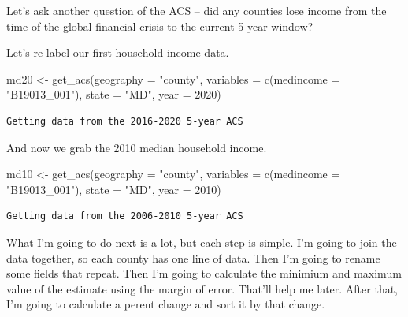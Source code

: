 \documentclass[
  letterpaper,
  DIV=11,
  numbers=noendperiod]{scrreprt}
\newenvironment{Shaded}{\begin{snugshade}}{\end{snugshade}}
\newcommand{\AttributeTok}[1]{\textcolor[rgb]{0.40,0.45,0.13}{#1}}
\newcommand{\DecValTok}[1]{\textcolor[rgb]{0.68,0.00,0.00}{#1}}
\newcommand{\FunctionTok}[1]{\textcolor[rgb]{0.28,0.35,0.67}{#1}}
\newcommand{\NormalTok}[1]{\textcolor[rgb]{0.00,0.23,0.31}{#1}}
\newcommand{\OtherTok}[1]{\textcolor[rgb]{0.00,0.23,0.31}{#1}}
\newcommand{\StringTok}[1]{\textcolor[rgb]{0.13,0.47,0.30}{#1}}
\begin{document}
Let's ask another question of the ACS -- did any counties lose income
from the time of the global financial crisis to the current 5-year
window?

Let's re-label our first household income data.

\begin{Shaded}
\begin{Highlighting}[]
\NormalTok{md20 }\OtherTok{\textless{}{-}} \FunctionTok{get\_acs}\NormalTok{(}\AttributeTok{geography =} \StringTok{"county"}\NormalTok{,}
              \AttributeTok{variables =} \FunctionTok{c}\NormalTok{(}\AttributeTok{medincome =} \StringTok{"B19013\_001"}\NormalTok{),}
              \AttributeTok{state =} \StringTok{"MD"}\NormalTok{,}
              \AttributeTok{year =} \DecValTok{2020}\NormalTok{)}
\end{Highlighting}
\end{Shaded}

\begin{verbatim}
Getting data from the 2016-2020 5-year ACS
\end{verbatim}

And now we grab the 2010 median household income.

\begin{Shaded}
\begin{Highlighting}[]
\NormalTok{md10 }\OtherTok{\textless{}{-}} \FunctionTok{get\_acs}\NormalTok{(}\AttributeTok{geography =} \StringTok{"county"}\NormalTok{,}
              \AttributeTok{variables =} \FunctionTok{c}\NormalTok{(}\AttributeTok{medincome =} \StringTok{"B19013\_001"}\NormalTok{),}
              \AttributeTok{state =} \StringTok{"MD"}\NormalTok{,}
              \AttributeTok{year =} \DecValTok{2010}\NormalTok{)}
\end{Highlighting}
\end{Shaded}

\begin{verbatim}
Getting data from the 2006-2010 5-year ACS
\end{verbatim}

What I'm going to do next is a lot, but each step is simple. I'm going
to join the data together, so each county has one line of data. Then I'm
going to rename some fields that repeat. Then I'm going to calculate the
minimium and maximum value of the estimate using the margin of error.
That'll help me later. After that, I'm going to calculate a perent
change and sort it by that change.
\end{document}
